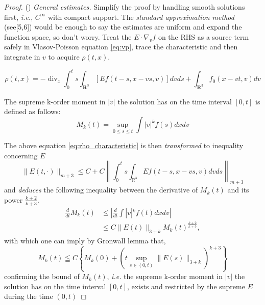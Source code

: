 \begin{proof}

() \textit{General estimates.} Simplify the proof by handling smooth solutions first, \textit{i.e.}, $C^\infty$ with compact support. The \emph{standard approximation method} (see[5,6]) would be enough to say the estimates are uniform and expand the function space, so don't worry. Treat the $E\cdot \nabla_v f$ on the RHS as a source term safely in Vlasov-Poisson equation \eqref{eq:vp}, trace the characteristic and then integrate in $v$ to acquire $\rho(t,x)$. 

\begin{equation}
\label{eq:rho_characteristic}
\rho(t, x)=-\operatorname{div}_{x} \int_{0}^{t} s \int_{\mathbf{R}^{3}}[E f(t-s, x-v s, v)] d v d s+\int_{\mathbf{R}^{3}} f_{0}(x-v t, v) d v\end{equation}


\begin{definition}
The supreme k-order moment in $|v|$ the solution has on the time interval $[0,t]$ is defined as follows:
\begin{equation}
    M_{k}(t)=\sup _{0 \leq s \leq t} \int|v|^{k} f(s) d x d v
\end{equation}
\end{definition}

The above equation \eqref{eq:rho_characteristic} is then \emph{transformed} to inequality concerning $E$
\begin{equation}\label{eq:E-norm-bound}
\|E(t,\cdot)\|_{m+3} \leq C+C\left\|\int_{0}^{t} s \int_{\mathbb{R}^{3}} E f(t-s, x-v s, v) d v d s\right\|_{m+3}\end{equation}
and \emph{deduces} the following inequality between the derivative of $M_{k}(t)$ and its power $\frac{k+2}{k+3} $.
\begin{equation}\label{eq:Mk-derivative-bound}\begin{aligned}
    \frac{d}{d t} M_{k}(t) & \leq | \frac{d}{d t} \int|v|^{k} f(t) d x d v | \\
    & \leq C\|E(t)\|_{3+k} M_{k}(t)^{\frac{k+2}{k+3}},
\end{aligned}\end{equation}
with which one can imply by Gronwall lemma that,
\begin{equation}M_{k}(t) \leqq C\left\{M_{k}(0)+\left(t \sup _{s \in(0, t)}\|E(s)\|_{3+k}\right)^{k+3}\right\}\end{equation}
confirming the bound of $M_{k}(t)$, \textit{i.e.} the supreme k-order moment in $|v|$ the solution has on the time interval $[0,t]$, exists and restricted by the supreme $E$ during the time $(0,t)$



\end{proof}
